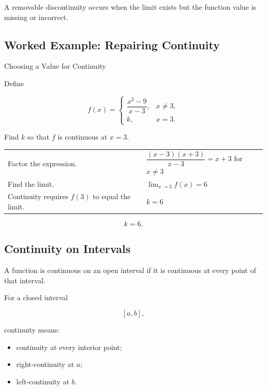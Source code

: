 A removable discontinuity occurs when the limit exists but the function
value is missing or incorrect.

\subsection{Worked Example: Repairing Continuity}
\label{subsec:worked-repair-continuity}

\begin{workedexamplebox}{Choosing a Value for Continuity}

Define

\[
f(x)=
\begin{cases}
\dfrac{x^2-9}{x-3}, & x\neq3,\\
k, & x=3.
\end{cases}
\]

Find \(k\) so that \(f\) is continuous at \(x=3\).

\begin{tabularx}{\textwidth}{@{}>{\raggedright\arraybackslash}p{}X@{}}
Factor the expression. &
\(\dfrac{(x-3)(x+3)}{x-3}=x+3\) for \(x\neq3\)\\
Find the limit. &
\(\displaystyle \lim_{x\to3}f(x)=6\)\\
Continuity requires \(f(3)\) to equal the limit. &
\(k=6\)
\end{tabularx}

\begin{answerbox}
\[ \boxed{k=6.} \]
\end{answerbox}
\end{workedexamplebox}

\subsection{Continuity on Intervals}
\label{subsec:continuity-intervals}

A function is continuous on an open interval if it is continuous at every
point of that interval.

For a closed interval

\[ [a,b], \]

continuity means:

\begin{itemize}
    \item continuity at every interior point;
    \item right-continuity at \(a\);
    \item left-continuity at \(b\).
\end{itemize}

